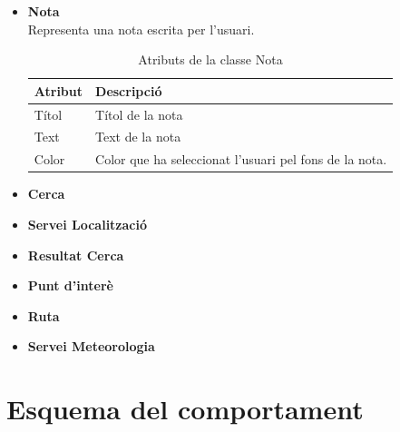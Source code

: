 \begin{itemize}
\item[]\textbf{Nota}\\
Representa una nota escrita per l'usuari.

\begin{table}[!h]
\begin{tabular}{|M|T|}
\hline
\textbf{Atribut}  & \textbf{Descripció} \\\hline
Títol & Títol de la nota\\\hline
Text &  Text de la nota\\\hline
Color & Color que ha seleccionat l'usuari pel fons de la nota.\\\hline
\end{tabular}
\label{}
\caption{Atributs de la classe Nota}
\end{table}

\item[]\textbf{Cerca}

\item[]\textbf{Servei Localització}

\item[]\textbf{Resultat Cerca}

\item[]\textbf{Punt d'interè}

\item[]\textbf{Ruta}

\item[]\textbf{Servei Meteorologia}



\end{itemize}

\section{Esquema del comportament}

